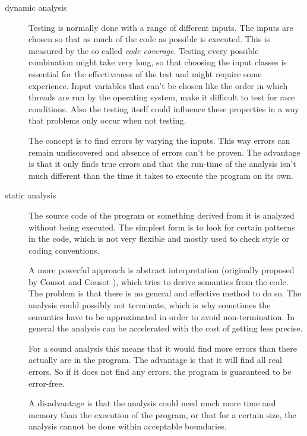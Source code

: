 \begin{description}
 \item[dynamic analysis]
Testing is normally done with a range of different inputs. The inputs are chosen so that as much of the code as possible is executed. This is measured by the so called \textit{code coverage}. Testing every possible combination might take very long, so that choosing the input classes is essential for the effectiveness of the test and might require some experience. Input variables that can't be chosen like the order in which threads are run by the operating system, make it difficult to test for race conditions. Also the testing itself could influence these properties in a way that problems only occur when not testing.

The concept is to find errors by varying the inputs. This way errors can remain undiscovered and absence of errors can't be proven.
The advantage is that it only finds true errors and that the run-time of the analysis isn't much different than the time it takes to execute the program on its own.

\item[static analysis]
The source code of the program or something derived from it is analyzed without being executed.
The simplest form is to look for certain patterns in the code, which is not very flexible and mostly used to check style or coding conventions.

A more powerful approach is abstract interpretation (originally proposed by Cousot and Cousot \cite{Cousot:1977:AIU:512950.512973}), which tries to derive semantics from the code.
The problem is that there is no general and effective method to do so. The analysis could possibly not terminate, which is why sometimes the semantics have to be approximated in order to avoid non-termination. In general the analysis can be accelerated with the cost of getting less precise.

For a sound analysis this means that it would find more errors than there actually are in the program. The advantage is that it will find all real errors. So if it does not find any errors, the program is guaranteed to be error-free.

A disadvantage is that the analysis could need much more time and memory than the execution of the program, or that for a certain size, the analysis cannot be done within acceptable boundaries.
\end{description}


